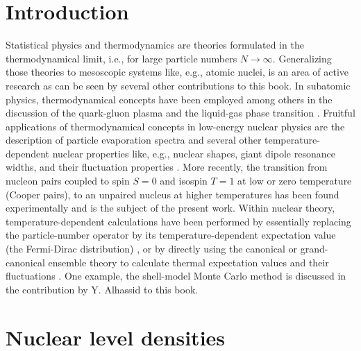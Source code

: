 \documentclass[sort&compress,final,numberedheadings]{aipproc}
\begin{document}
\maketitle

\section{Introduction}

Statistical physics and thermodynamics are theories formulated in the 
thermodynamical limit, i.e., for large particle numbers $N\rightarrow\infty$. 
Generalizing those theories to mesoscopic systems like, e.g., atomic nuclei, is
an area of active research as can be seen by several other contributions to 
this book. In subatomic physics, thermodynamical concepts have been employed 
among others in the discussion of the quark-gluon plasma \cite{MH00} and the 
liquid-gas phase transition \cite{PM95}. Fruitful applications of 
thermodynamical concepts in low-energy nuclear physics are the description of 
particle evaporation spectra \cite{Er60} and several other 
temperature-dependent nuclear properties like, e.g., nuclear shapes, giant 
dipole resonance widths, and their fluctuation properties \cite{KA98}. More 
recently, the transition from nucleon pairs coupled to spin $S=0$ and isospin 
$T=1$ at low or zero temperature (Cooper pairs), to an unpaired nucleus at 
higher temperatures has been found experimentally \cite{MB99} and is the 
subject of the present work. Within nuclear theory, temperature-dependent 
calculations have been performed by essentially replacing the particle-number 
operator by its temperature-dependent expectation value (the Fermi-Dirac 
distribution) \cite{SW72}, or by directly using the canonical or 
grand-canonical ensemble theory to calculate thermal expectation values and 
their fluctuations \cite{KA98}. One example, the shell-model Monte Carlo method
is discussed in the contribution by Y. Alhassid to this book. 

\section{Nuclear level densities}
\end{document}
